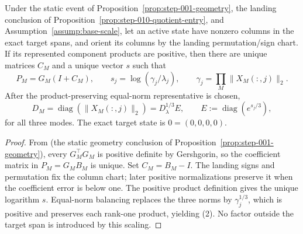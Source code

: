\begin{lemma}\label{lem:step-011-quotient-chart}
Under the static event of Proposition~\ref{prop:step-001-geometry}, the
landing conclusion of Proposition~\ref{prop:step-010-quotient-entry}, and
Assumption~\ref{assump:base-scale}, let an active state have nonzero columns in the exact
target spans, and orient its columns by the landing permutation/sign chart.
If its represented component products are positive, then there are unique
matrices \(C_M\) and a unique vector \(s\) such that
\[
 P_M=G_M(I+C_M),\qquad
 s_j=\log(\gamma_j/\lambda_j),
 \qquad \gamma_j=\prod_M\|X_M(:,j)\|_2.
 \tag{1}
\]
After the product-preserving equal-norm representative is chosen,
\[
 D_M=\operatorname{diag}(\|X_M(:,j)\|_2)
  =D_\lambda^{1/3}E,
 \qquad E:=\operatorname{diag}(e^{s_j/3}),
 \tag{2}
\]
for all three modes. The exact target state is \(0=(0,0,0,0)\).

\begin{proof}
From (the static geometry conclusion of Proposition~\ref{prop:step-001-geometry}), every \(G_M^\top G_M\) is positive
definite by Gershgorin, so the coefficient matrix in
\(P_M=G_MB_M\) is unique. Set \(C_M=B_M-I\). The landing signs and
permutation fix the column chart; later positive normalizations preserve it
when the coefficient error is below one. The positive product definition
gives the unique logarithm \(s\). Equal-norm balancing replaces the three
norms by \(\gamma_j^{1/3}\), which is positive and preserves each rank-one
product, yielding (2). No factor outside the target span is introduced by
this scaling.


\end{proof}
\end{lemma}
